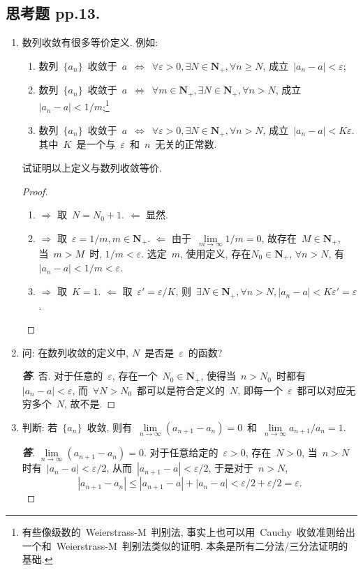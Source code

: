 \documentclass[UTF8,a4paper,11pt,twoside]{book}
\begin{document}
\subsection{思考题 pp.13.}
\kaishu
\begin{enumerate}
	\item 数列收敛有很多等价定义. 例如:
	      \begin{enumerate}[(1)]
		      \item 数列~$\{a_n\}$~收敛于~$a$~$\Longleftrightarrow$~$\forall\varepsilon>0,\exists N\in\mathbf{N}_{+},\forall n\geqslant N$, 成立~$|a_n-a|<\varepsilon$;
		      \item 数列~$\{a_n\}$~收敛于~$a$~$\Longleftrightarrow$~$\forall m\in\mathbf{N}_{+},\exists N\in\mathbf{N}_{+},\forall n>N$, 成立~$|a_n-a|<1/m$;\footnote{有些像级数的~Weierstrass-M~判别法, 事实上也可以用~Cauchy~收敛准则给出一个和~Weierstrass-M~判别法类似的证明. 本条是所有二分法/三分法证明的基础.}
		      \item 数列~$\{a_n\}$~收敛于~$a$~$\Longleftrightarrow$~$\forall\varepsilon>0,\exists N\in\mathbf{N}_{+},\forall n>N$, 成立~$|a_n-a|<K\varepsilon$. 其中~$K$~是一个与~$\varepsilon$~和~$n$~无关的正常数.
	      \end{enumerate}
	      试证明以上定义与数列收敛等价.

	      \begin{proof}
		      \begin{enumerate}[(1)]
			      \item $\Rightarrow$ 取~$N=N_0+1$. $\Leftarrow$ 显然.
			      \item $\Rightarrow$ 取~$\varepsilon=1/m, m\in\mathbf{N}_{+}$. $\Leftarrow$ 由于~$\lim\limits_{m\to\infty} 1/m=0$, 故存在~$M\in\mathbf{N}_{+}$, 当~$m>M$~时, $1/m<\varepsilon$. 选定~$m$, 使用定义, 存在$N_0\in\mathbf{N}_{+}$, $\forall n>N$, 有~$|a_n-a|<1/m<\varepsilon$.
			      \item $\Rightarrow$ 取~$K=1$. $\Leftarrow$ 取~$\varepsilon'=\varepsilon/K$, 则~$\exists N\in\mathbf{N}_{+}, \forall n>N, |a_n-a|<K\varepsilon'=\varepsilon$.\qedhere
		      \end{enumerate}
	      \end{proof}

	\item 问: 在数列收敛的定义中, $N$~是否是~$\varepsilon$~的函数?
	      \begin{proof}[\bf 答]
		      否. 对于任意的~$\varepsilon$, 存在一个~$N_0\in\mathbf{N}_{+}$, 使得当~$n>N_0$~时都有~$|a_n-a|<\varepsilon$, 而~$\forall N>N_0$~都可以是符合定义的~$N$, 即每一个~$\varepsilon$~都可以对应无穷多个~$N$, 故不是.\qedhere
	      \end{proof}
	\item 判断: 若~$\{a_n\}$~收敛, 则有~$\lim\limits_{n\to\infty} (a_{n+1}-a_n)=0$~和~$\lim\limits_{n\to\infty} a_{n+1}/a_n=1$.
	      \begin{proof}[\bf 答]
		      $\lim\limits_{n\to\infty} (a_{n+1}-a_n)=0$. 对于任意给定的~$\varepsilon>0$, 存在~$N>0$, 当~$n>N$时有~$|a_n-a|<\varepsilon/2$, 从而~$|a_{n+1}-a|<\varepsilon/2$, 于是对于~$n>N$,
		      \[
			      |a_{n+1}-a_n|\leqslant|a_{n+1}-a|+|a_n-a|<\varepsilon/2+\varepsilon/2=\varepsilon.
		      \]


\end{proof}
\end{enumerate}
\end{document}
